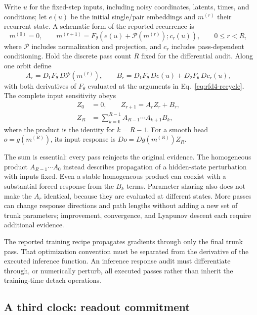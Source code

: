 Write $u$ for the fixed-step inputs, including noisy coordinates, latents, times, and conditions;
let $e(u)$ be the initial single/pair embeddings and $m^{(r)}$ their recurrent state.  A schematic
form of the reported recurrence is
\begin{equation}
m^{(0)}=0,\qquad
m^{(r+1)}=F_\theta\!\left(e(u)+\mathcal P(m^{(r)});c_r(u)\right),
\qquad 0\leq r<R,
\label{eq:rfd4-recycle}
\end{equation}
where $\mathcal P$ includes normalization and projection, and $c_r$ includes pass-dependent
conditioning.  Hold the discrete pass count $R$ fixed for the differential audit.  Along one
orbit define
\begin{equation}
A_r=D_1F_\theta\,D\mathcal P(m^{(r)}),\qquad
B_r=D_1F_\theta\,De(u)+D_2F_\theta\,Dc_r(u),
\label{eq:rfd4-recycle-factors}
\end{equation}
with both derivatives of $F_\theta$ evaluated at the arguments in
Eq.~\ref{eq:rfd4-recycle}.  The complete input sensitivity obeys
\begin{align}
Z_0&=0,\qquad Z_{r+1}=A_rZ_r+B_r,\\
Z_R&=\sum_{k=0}^{R-1}A_{R-1}\cdots A_{k+1}B_k,
\label{eq:rfd4-forced-response}
\end{align}
where the product is the identity for $k=R-1$.  For a smooth head $o=g(m^{(R)})$, its input
response is $Do=Dg(m^{(R)})Z_R$.

The sum is essential: every pass reinjects the original evidence.  The homogeneous product
$A_{R-1}\cdots A_0$ instead describes propagation of a hidden-state perturbation with inputs
fixed.  Even a stable homogeneous product can coexist with a substantial forced response from
the $B_k$ terms.  Parameter sharing also does not make the $A_r$ identical, because they are
evaluated at different states.  More passes can change response directions and path lengths
without adding a new set of trunk parameters; improvement, convergence, and Lyapunov descent
each require additional evidence.

The reported training recipe propagates gradients through only the final trunk pass.  That
optimization convention must be separated from the derivative of the executed inference
function.  An inference response audit must differentiate through, or numerically perturb,
all executed passes rather than inherit the training-time detach operations.

\subsection{A third clock: readout commitment}

